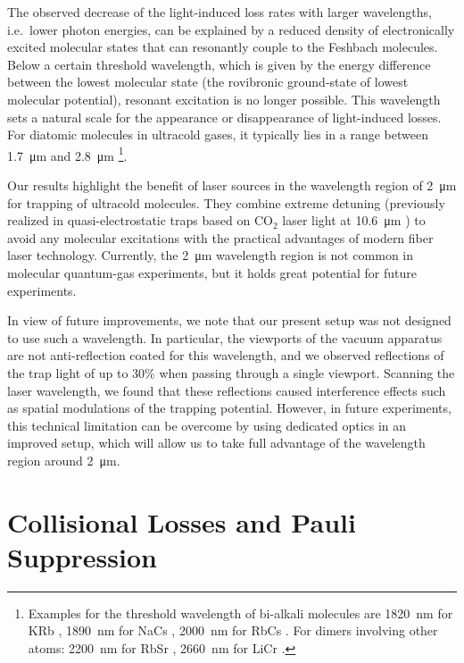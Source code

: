 The observed decrease of the light-induced loss rates with larger wavelengths, i.e.\ lower photon energies, can be explained by a reduced density of electronically excited molecular states that can resonantly couple to the Feshbach molecules. Below a certain threshold wavelength, which is given by the energy difference between the lowest molecular state (the rovibronic ground-state of lowest molecular potential), resonant excitation is no longer possible. This wavelength sets a natural scale for the appearance or disappearance of light-induced losses.
For diatomic molecules in ultracold gases, it typically lies in a range between \SI{1.7}{\micro m} and \SI{2.8}{\micro m} \footnote{Examples for the threshold wavelength of bi-alkali molecules are
	\SI{1820}{\nano m} for KRb \cite{Ni2008ahp},
	\SI{1890}{\nano m} for NaCs \cite{Warner2023ept},
	\SI{2000}{\nano m} for RbCs \cite{Takekoshi2014uds}.
	For dimers involving other atoms:
	\SI{2200}{\nano m} for RbSr \cite{Zuchowski2014gae},
	\SI{2660}{\nano m} for LiCr \cite{Finelli2024ula}.
}.

Our results highlight the benefit of laser sources in the wavelength region of \SI{2}{\micro m} for trapping of ultracold molecules. They combine extreme detuning (previously realized in quasi-electrostatic traps based on CO$_2$ laser light at \SI{10.6}{\micro m} \cite{Takekoshi1998ooo, Grimm2000odt}) to avoid any molecular excitations with the practical advantages of modern fiber laser technology.
Currently, the \SI{2}{\micro m} wavelength region is not common in molecular quantum-gas experiments, but it holds great potential for future experiments. 

In view of future improvements, we note that our present setup was not designed to use such a wavelength. In particular, the viewports of the vacuum apparatus are not anti-reflection coated for this wavelength, and we observed reflections of the trap light of up to 30\% when passing through a single viewport. Scanning the laser wavelength, {we found that these reflections caused interference effects such as spatial modulations of the trapping potential.} However, in future experiments, this technical limitation can be overcome by using dedicated optics in an improved setup, which will allow us to take full advantage of  the wavelength region around \SI{2}{\micro m}. 

\section{Collisional Losses and Pauli Suppression}
\label{Sec:Collisions}


